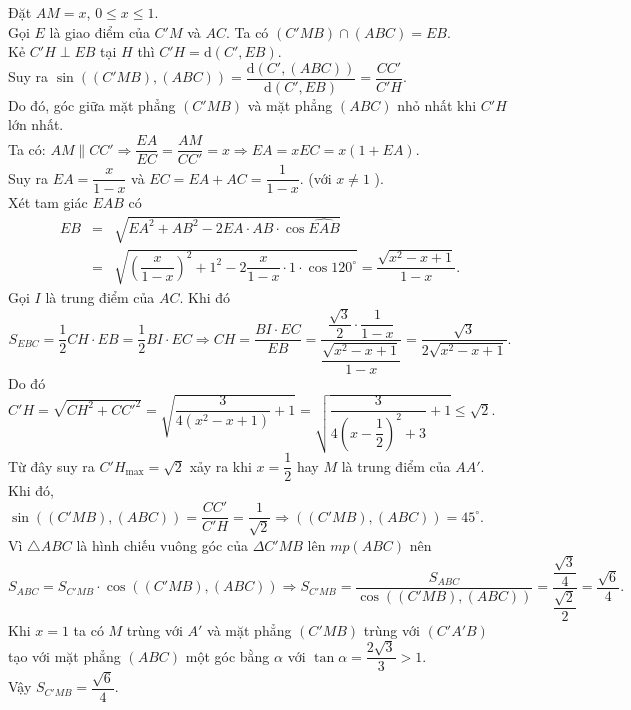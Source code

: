 \begin{vd}
{		Đặt $AM=x$, $0\le x\le 1$.\\
		Gọi $E$ là giao điểm của $C'M$ và $AC$. Ta có $(C'MB)\cap (ABC)=EB$.\\
		Kẻ $C'H\perp EB$ tại $H$ thì $C'H=\mathrm{d}(C',EB)$.\\
		Suy ra $\sin ((C'MB),(ABC))=\dfrac {\mathrm{d}(C',(ABC))}{\mathrm{d}(C',EB)}=\dfrac {CC'}{C'H}$.\\
		Do đó, góc giữa mặt phẳng $(C'MB)$ và mặt phẳng $(ABC)$ nhỏ nhất khi $C'H$ lớn nhất.\\
		Ta có: $AM\parallel CC'\Rightarrow \dfrac {EA}{EC}=\dfrac {AM}{CC'}=x\Rightarrow EA=xEC=x(1+EA)$.\\
		Suy ra $EA=\dfrac {x}{1-x}$ và $EC=EA+AC=\dfrac {1}{1-x}$. (với $ x\ne 1$ ).\\
		Xét tam giác $EAB$ có
		\begin{eqnarray*}
			EB&=&\sqrt {EA^2+AB^2-2EA\cdot AB\cdot \cos \widehat{EAB}}\\ 
			&=&\sqrt {\left( \dfrac {x}{1-x} \right)^2+1^2-2\dfrac {x}{1-x}\cdot 1\cdot \cos 120^\circ }=\dfrac {\sqrt {x^2-x+1}}{1-x}. 
		\end{eqnarray*}
		Gọi $I$ là trung điểm của $AC$. Khi đó
		$$S_{EBC}=\dfrac {1}{2}CH\cdot EB=\dfrac {1}{2}BI\cdot EC\Rightarrow CH=\dfrac {BI\cdot EC}{EB}=\dfrac {\dfrac {\sqrt {3}}{2}\cdot \dfrac {1}{1-x}}{\dfrac {\sqrt {x^2-x+1}}{1-x}}=\dfrac {\sqrt {3}}{2\sqrt {x^2-x+1}}.$$
		Do đó $C'H=\sqrt {CH^2+CC'^2}=\sqrt {\dfrac {3}{4(x^2-x+1)}+1}=\sqrt {\dfrac {3}{4\left( x-\dfrac {1}{2} \right)^2+3}+1}\le \sqrt {2}$.\\
		Từ đây suy ra $C'H_{\max}=\sqrt {2}$ xảy ra khi $x=\dfrac {1}{2}$ hay $M$ là trung điểm của $AA'$.\\
		Khi đó, $\sin \left((C'MB),(ABC)\right)=\dfrac {CC'}{C'H}=\dfrac {1}{\sqrt {2}}\Rightarrow \left((C'MB),(ABC)\right)=45^\circ$.\\
		Vì $\triangle ABC$ là hình chiếu vuông góc của $\Delta C'MB$ lên $ mp(ABC)$ nên
		$$S_{ABC}=S_{C'MB}\cdot \cos \left(({C}'MB),(ABC)\right)\Rightarrow S_{C'MB}=\dfrac {S_{ABC}}{\cos \left((C'MB),(ABC)\right)}=\dfrac {\dfrac{\sqrt {3}}{4}}{\dfrac{\sqrt {2}}{2}}=\dfrac {\sqrt {6}}{4}.$$
		Khi $ x=1$ ta có $M$ trùng với $A'$ và mặt phẳng $(C'MB)$ trùng với $(C'A'B)$ tạo với mặt phẳng $(ABC)$ một góc bằng $\alpha $ với $\tan \alpha =\dfrac {2\sqrt {3}}{3}>1$.\\
		Vậy $S_{C'MB}=\dfrac {\sqrt {6}}{4}$.
	}
\end{vd}
